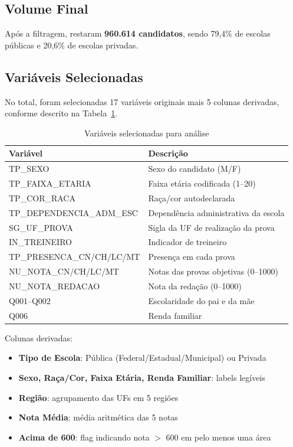 \documentclass[a4paper,12pt]{article}
\begin{document}
\subsection{Volume Final}

Após a filtragem, restaram \textbf{960.614 candidatos}, sendo 79,4\% de escolas públicas e 20,6\% de escolas privadas.

\subsection{Variáveis Selecionadas}

No total, foram selecionadas 17 variáveis originais mais 5 colunas derivadas, conforme descrito na Tabela~\ref{tab:variaveis}.

\begin{table}[H]
\centering
\caption{Variáveis selecionadas para análise}
\label{tab:variaveis}
\begin{tabular}{ll}
\toprule
\textbf{Variável} & \textbf{Descrição} \\
\midrule
TP\_SEXO & Sexo do candidato (M/F) \\
TP\_FAIXA\_ETARIA & Faixa etária codificada (1--20) \\
TP\_COR\_RACA & Raça/cor autodeclarada \\
TP\_DEPENDENCIA\_ADM\_ESC & Dependência administrativa da escola \\
SG\_UF\_PROVA & Sigla da UF de realização da prova \\
IN\_TREINEIRO & Indicador de treineiro \\
TP\_PRESENCA\_CN/CH/LC/MT & Presença em cada prova \\
NU\_NOTA\_CN/CH/LC/MT & Notas das provas objetivas (0--1000) \\
NU\_NOTA\_REDACAO & Nota da redação (0--1000) \\
Q001--Q002 & Escolaridade do pai e da mãe \\
Q006 & Renda familiar \\
\bottomrule
\end{tabular}
\end{table}

Colunas derivadas:
\begin{itemize}
    \item \textbf{Tipo de Escola}: Pública (Federal/Estadual/Municipal) ou Privada
    \item \textbf{Sexo, Raça/Cor, Faixa Etária, Renda Familiar}: labels legíveis
    \item \textbf{Região}: agrupamento das UFs em 5 regiões
    \item \textbf{Nota Média}: média aritmética das 5 notas
    \item \textbf{Acima de 600}: flag indicando nota $>$ 600 em pelo menos uma área
\end{itemize}
\end{document}

